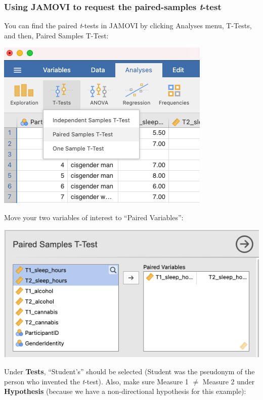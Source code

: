 \documentclass[
]{book}
\begin{document}
\hypertarget{using-jamovi-to-request-the-paired-samples-t-test}{%
\subsubsection{\texorpdfstring{Using JAMOVI to request the paired-samples \emph{t}-test}{Using JAMOVI to request the paired-samples t-test}}\label{using-jamovi-to-request-the-paired-samples-t-test}}

You can find the paired \emph{t}-tests in JAMOVI by clicking {Analyses} menu, {T-Tests}, and then, {Paired Samples T-Test}:

\includegraphics{img/paired_menu.png}

Move your two variables of interest to ``Paired Variables'':

\includegraphics{img/select_vars_pairedttest.png}

Under \textbf{Tests}, ``Student's'' should be selected (Student was the pseudonym of the person who invented the \emph{t}-test). Also, make sure Measure 1 \(\neq\) Measure 2 under \textbf{Hypothesis} (because we have a non-directional hypothesis for this example):
\end{document}
